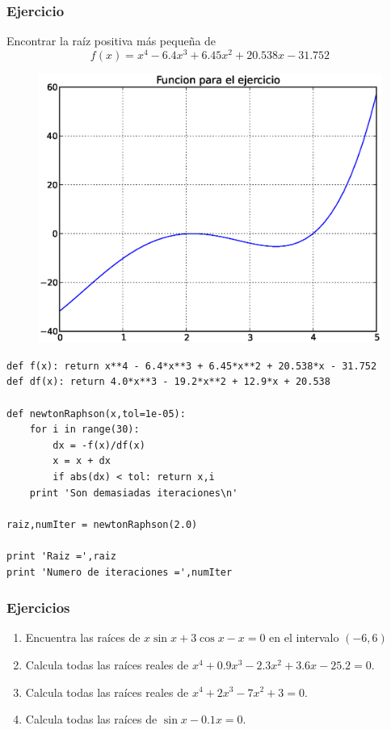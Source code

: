 \documentclass[12pt]{beamer}
\begin{document}
\begin{frame}
\frametitle{Ejercicio}
Encontrar la ra\'{i}z positiva m\'{a}s pequeña de
\[ f(x) = x^{4} - 6.4 x^{3} + 6.45x^{2} + 20.538x - 31.752\]
\begin{figure}
	\centering
	 {\includegraphics[scale=0.3]{raices08.eps}}
\end{figure}
\end{frame}
\begin{frame}[fragile]
\begin{lstlisting}
def f(x): return x**4 - 6.4*x**3 + 6.45*x**2 + 20.538*x - 31.752
def df(x): return 4.0*x**3 - 19.2*x**2 + 12.9*x + 20.538

def newtonRaphson(x,tol=1e-05):
    for i in range(30):
        dx = -f(x)/df(x)
        x = x + dx
        if abs(dx) < tol: return x,i
    print 'Son demasiadas iteraciones\n'

raiz,numIter = newtonRaphson(2.0)

print 'Raiz =',raiz
print 'Numero de iteraciones =',numIter
\end{lstlisting}
\end{frame}
\begin{frame}
\frametitle{Ejercicios}
\begin{enumerate}
\item Encuentra las ra\'{i}ces de $x \sin x + 3 \cos x - x = 0$ en el intervalo $(-6,6)$ \\
\item Calcula todas las ra\'{i}ces reales de $x^{4} + 0.9x^{3} - 2.3x^{2} + 3.6x - 25.2 = 0$. \\
\item Calcula todas las ra\'{i}ces reales de $x^{4} + 2x^{3} - 7x^{2} + 3 = 0$. \\
\item Calcula todas las ra\'{i}ces de $\sin x - 0.1x = 0$.
\end{enumerate}
\end{frame}
\end{document}
